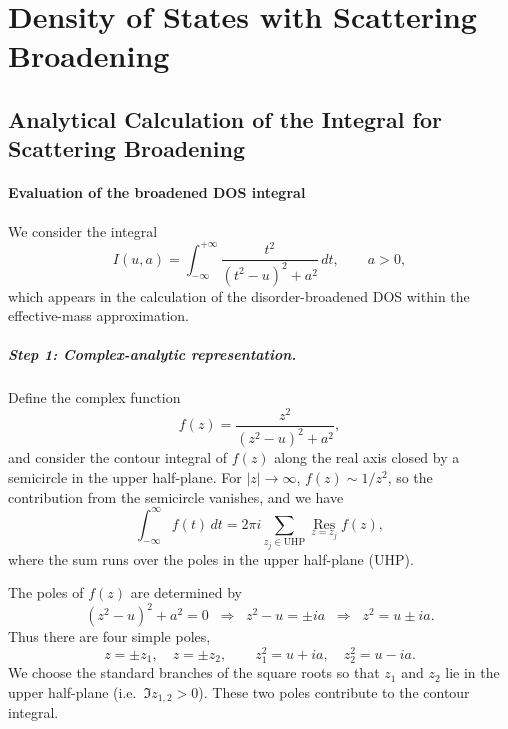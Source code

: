 \chapter{Density of States with Scattering Broadening}
\label{cha:app1}


\section{Analytical Calculation of the Integral for Scattering Broadening}
\label{sec:analytical_integral}



\subsubsection*{Evaluation of the broadened DOS integral}

We consider the integral
\begin{equation}
I(u,a) = \int_{-\infty}^{+\infty}
\frac{t^2}{(t^2 - u)^2 + a^2}\,dt,
\qquad a>0,
\label{eq:I_def_manual}
\end{equation}
which appears in the calculation of the disorder-broadened DOS within the effective-mass approximation.


\paragraph{Step 1: Complex-analytic representation.}

Define the complex function
\begin{equation}
f(z) =
\frac{z^2}{(z^2 - u)^2 + a^2},
\end{equation}
and consider the contour integral of $f(z)$ along the real axis closed by a semicircle in the upper half-plane.  
For $|z|\to\infty$, $f(z)\sim 1/z^2$, so the contribution from the semicircle vanishes, and we have
\begin{equation}
\int_{-\infty}^{\infty} f(t)\,dt
=
2\pi i \sum_{z_j \in \text{UHP}} \operatorname*{Res}_{z=z_j} f(z),
\label{eq:contour_I}
\end{equation}
where the sum runs over the poles in the upper half-plane (UHP).

The poles of $f(z)$ are determined by
\begin{equation}
(z^2-u)^2 + a^2 = 0
\;\;\Rightarrow\;\;
z^2 - u = \pm i a
\;\;\Rightarrow\;\;
z^2 = u \pm i a.
\end{equation}
Thus there are four simple poles,
\begin{equation}
z = \pm z_1, \quad z=\pm z_2,
\qquad
z_1^2 = u + i a,\quad z_2^2 = u - i a.
\end{equation}
We choose the standard branches of the square roots so that $z_1$ and $z_2$ lie in the upper half-plane (i.e.\ $\Im z_{1,2} > 0$). These two poles contribute to the contour integral.

